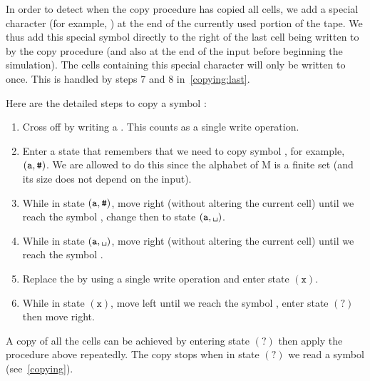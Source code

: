 In order to detect when the copy procedure has copied all cells, we add a
special character (for example, \e)
at the end of the currently used portion of the tape.
We thus add this special symbol directly to the right of the last cell being written to by the
copy procedure (and also at the end of the input before beginning the
simulation). The cells containing this special character will only be written to once.
This is handled by steps 7 and 8 in~\ref{copying:last}.

Here are the detailed steps to copy a symbol \A{}:
\begin{enumerate}
	\item Cross off \A{} by writing a \X{}. This
		counts as a single write operation.
	\item Enter a state that remembers that we need to copy symbol
		\A{}, for example, \((\texttt{a},\texttt{\#})\). We are allowed
		to do this since the alphabet of M is a finite set (and its size does not
		depend on the input).
	\item While in state \((\texttt{a},\texttt{\#})\), move right (without
		altering the current cell) until we reach
		the symbol \e, change then to state
		\((\s,\0{})\).
	\item While in state \((\s,\0{})\), move right (without
	altering the current cell) until we reach the symbol \0{}.
	\item Replace the \0{} by \A{} using a
		single write operation and enter state \((\texttt{x})\).
	\item While in state \((\texttt{x})\), move left until we reach
		the symbol \X{}, enter state \((\texttt{?})\)
		then move right.
\end{enumerate}
A copy of all the cells can be achieved by entering state \((\texttt{?})\)
then apply the procedure above repeatedly.
The copy stops when in state \((\texttt{?})\) we read a \e{}
symbol (see~\ref{copying}).
